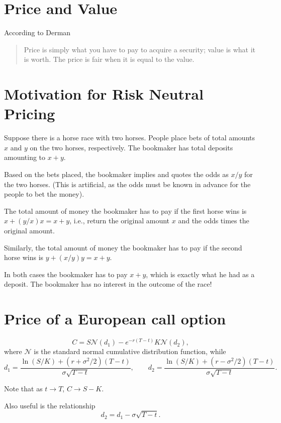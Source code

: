 \documentclass{amsart}
\theoremstyle{plain}
\numberwithin{equation}{section}
\begin{document}
\section{Price and Value}
According to Derman
\begin{quote}
Price is simply what you have to pay to acquire a 
security; value is what it is worth. The price is fair
when it is equal to the value.
\end{quote}

\section*{Motivation for Risk Neutral Pricing}
Suppose there is a horse race with two horses.
People place bets of total amounts $x$ and 
$y$ on the two horses, respectively. The bookmaker has 
total deposits amounting to $x+y$. 

Based on the bets placed, the bookmaker 
implies and quotes the odds as $x/y$ for the two horses.
(This is artificial, as the odds must be known in advance
for the people to bet the money).

The total amount of money the bookmaker has to pay 
if the first horse wins is 
$x + (y/x) x = x + y$, i.e., return the 
original amount $x$ and the odds times the original
amount.

Similarly, the total amount of money the bookmaker has to pay 
if the second horse wins is 
$y + (x/y) y = x + y$. 

In both cases the bookmaker has to pay $x+y$, which is exactly 
what he had as a deposit. The bookmaker has no interest 
in the outcome of the race!


\section*{Price of a European call option}
\begin{equation}
C = S \mathcal{N} (d_1) - e^{-r(T-t)} K \mathcal{N} (d_2),
\end{equation}
where $\mathcal{N}$ is the standard normal 
cumulative distribution function, while
\begin{equation}
d_1 = \frac{\ln(S/K) + (r+\sigma^2/2)(T-t)}{\sigma \sqrt{T-t}}, \qquad 
d_2 = \frac{\ln(S/K) + (r-\sigma^2/2)(T-t)}{\sigma \sqrt{T-t}}.
\end{equation}

Note that as $t \to T$, $C \to S - K$. 

Also useful is the relationship
\begin{equation}
d_2 = d_1 - \sigma \sqrt{T-t}.
\end{equation}
\end{document}
